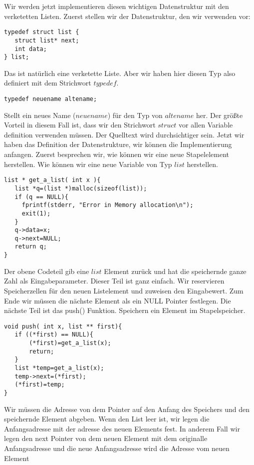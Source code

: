 \documentclass{article}[12pt]
\newenvironment{myexampleblock}[1]{%
    \tcolorbox[beamer,%
    noparskip,breakable,
    colback=White,colframe=ForestGreen,%
    colbacklower=LimeGreen!75!White,%
    title=#1]}%
    {\endtcolorbox}
\begin{document}
Wir werden jetzt implementieren diesen wichtigen Datenstruktur mit 
den verketetten Listen. Zuerst stellen wir der Datenstruktur, den wir verwenden
vor:
\begin{lstlisting}
typedef struct list {
   struct list* next;
   int data;
} list;
\end{lstlisting}
Das ist natürlich eine verketette Liste. Aber wir haben hier diesen Typ also definiert
mit dem Strichwort $typedef$.
\begin{myexampleblock}{Strichwort: \texttt{typedef}}
\begin{lstlisting}
typedef neuename altename;
\end{lstlisting}
\vspace{-0.4cm}
Stellt ein neues Name ($neuename$) für den Typ von $altename$ her.
\end{myexampleblock}
Der größte Vorteil in diesem Fall ist, dass wir den Strichwort $struct$ 
vor allen Variable definition verwenden müssen. Der Quelltext wird durchsichtiger
sein. Jetzt wir haben das Definition der Datenstrukture, wir können die Implementierung
anfangen. Zuerst besprechen wir, wie können wir eine neue Stapelelement herstellen.
Wie können wir eine neue Variable von Typ $list$ herstellen.
\begin{lstlisting}
list * get_a_list( int x ){
   list *q=(list *)malloc(sizeof(list));
   if (q == NULL){
     fprintf(stderr, "Error in Memory allocation\n");
     exit(1);
   }
   q->data=x;
   q->next=NULL;
   return q;
}
\end{lstlisting}
Der obene Codeteil gib eine $list$ Element zurück und hat die
speichernde ganze Zahl als Eingabeparameter. Dieser Teil ist ganz einfach.
Wir reservieren Speicherzellen für den neuen Listelement und zuweisen
den Eingabewert. Zum Ende wir müssen die nächste Element als ein NULL 
Pointer festlegen. Die nächste Teil ist das push() Funktion. Speichern 
ein Element im Stapelspeicher.
\begin{lstlisting}
void push( int x, list ** first){
   if ((*first) == NULL){
       (*first)=get_a_list(x);
       return;
   }
   list *temp=get_a_list(x);
   temp->next=(*first);
   (*first)=temp;
}
\end{lstlisting}
Wir müssen die Adresse von dem Pointer auf den Anfang des Speichers  und den speichernde 
Element abgeben. Wenn den List leer ist, wir legen die Anfangsadresse mit der adresse 
des  neuen Elements fest. In anderem Fall wir legen den next Pointer von dem neuen Element 
mit dem originalle Anfangsadresse und die neue Anfangsadresse wird die Adresse vom neuen Element 
\end{document}
